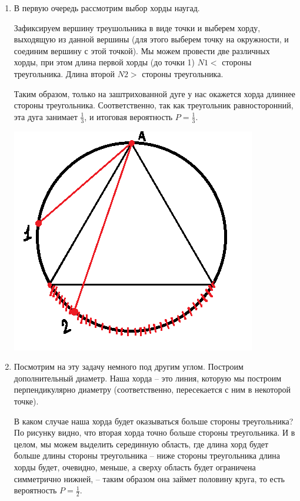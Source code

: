 \documentclass{article}
\begin{document}
\begin{enumerate}
\item В первую очередь рассмотрим выбор хорды наугад.

Зафиксируем вершину треушольника в виде точки и выберем хорду, выходящую из данной вершины (для этого выберем точку на окружности, и соединим вершину с этой точкой). Мы можем провести две различных хорды, при этом длина первой хорды (до точки 1) $N1 < $ стороны треугольника. Длина второй $N2 > $ стороны треугольника.

Таким образом, только на заштрихованной дуге у нас окажется хорда длиннее стороны треугольника. Соответственно, так как треугольник равносторонний, эта дуга занимает $\frac{1}{3}$, и итоговая вероятность $P = \frac{1}{3}$.

\begin{center}
    \includegraphics[scale=0.4]{2.png}
\end{center}

\item Посмотрим на эту задачу немного под другим углом. Построим дополнительный диаметр. Наша хорда -- это линия, которую мы построим перпендикулярно диаметру (соответственно, пересекается с ним в некоторой точке).

В каком случае наша хорда будет оказываться больше стороны треугольника? По рисунку видно, что вторая хорда точно больше стороны треугольника. И в целом, мы можем выделить серединную область, где длина хорд будет больше длины стороны треугольника -- ниже стороны треугольника длина хорды будет, очевидно, меньше, а сверху область будет ограничена симметрично нижней, -- таким образом она займет половину круга, то есть вероятность $P = \frac{1}{2}$.


\end{enumerate}
\end{document}
